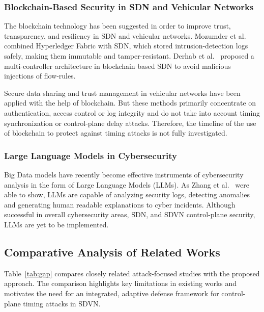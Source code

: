 \subsubsection{Blockchain-Based Security in SDN and Vehicular Networks}

The blockchain technology has been suggested in order to improve trust, transparency, and resiliency in SDN and vehicular networks. Mozumder et al.~\cite{Mozumder2020Blockchain} combined Hyperledger Fabric with SDN, which stored intrusion-detection logs safely, making them immutable and tamper-resistant. Derhab et al.~\cite{Derhab2021BMC} proposed a multi-controller architecture in blockchain based SDN to avoid malicious injections of flow-rules.

Secure data sharing and trust management in vehicular networks have been applied with the help of blockchain. But these methods primarily concentrate on authentication, access control or log integrity and do not take into account timing synchronization or control-plane delay attacks. Therefore, the timeline of the use of blockchain to protect against timing attacks is not fully investigated.

\subsubsection{Large Language Models in Cybersecurity}

Big Data models have recently become effective instruments of cybersecurity analysis in the form of Large Language Models (LLMs). As Zhang et al.~\cite{Zhang2024LLM} were able to show, LLMs are capable of analyzing security logs, detecting anomalies and generating human readable explanations to cyber incidents. Although successful in overall cybersecurity areas, SDN, and SDVN control-plane security, LLMs are yet to be implemented.

\subsection{Comparative Analysis of Related Works}
Table~\ref{tab:gap} compares closely related attack-focused studies with the proposed approach. The comparison highlights key limitations in existing works and motivates the need for an integrated, adaptive defense framework for control-plane timing attacks in SDVN.


